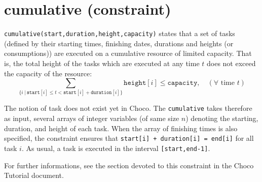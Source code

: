 \label{cumulative}
\hypertarget{cumulative}{}

\section{cumulative (constraint)}\label{cumulative:cumulativeconstraint}\hypertarget{cumulative:cumulativeconstraint}{}

\begin{notedef}
  \texttt{cumulative(start,duration,height,capacity)} states that a set of tasks (defined by their starting times, finishing dates, durations and heights (or consumptions)) are executed on a cumulative resource of limited capacity. That is, the total height of the tasks which are executed at any time $t$ does not exceed the capacity of the resource:
$$\sum_{\{i\ |\ \mathtt{start}[i]\le t < \mathtt{start}[i]+\mathtt{duration}[i]\}} \mathtt{height}[i] \le \mathtt{capacity},\quad (\forall \text{ time } t)$$
\end{notedef}

The notion of task does not exist yet in Choco. The \texttt{cumulative} takes therefore as input, several arrays of integer variables (of same size $n$) denoting the starting, duration, and height of each task. When the array of finishing times is also specified, the constraint ensures that \texttt{start[i] + duration[i] = end[i]} for all task $i$.
As usual, a task is executed in the interval \texttt{[start,end-1]}.

For further informations, see the section devoted to this constraint in the Choco Tutorial document. 


